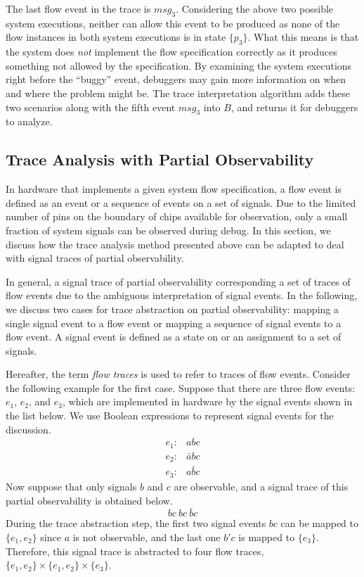 \documentclass[conference]{IEEEtran}
\begin{document}
The last flow event in the trace is $\mathit{msg}_3$.  Considering the above two possible system executions, neither can allow this event to be produced as none of the flow instances in both system executions is in state $\{p_3\}$.  What this means is that the system does {\em not} implement the flow specification correctly as it produces something not allowed by the specification.  By examining the system executions right before the ``buggy'' event, debuggers may gain more information on when and where the problem might be.  The trace interpretation algorithm adds these two scenarios along with the fifth event $\mathit{msg_3}$ into $B$, and returns it for debuggers to analyze.



\subsection{Trace Analysis with Partial Observability}

In hardware that implements a given system flow specification, a flow event is defined as an event or a sequence of events on a set of signals.  Due to the limited number of pins on the boundary of chips available for observation, only a small fraction of system signals can be observed during debug.  In this section, we discuss how the trace analysis method presented above can be adapted to deal with signal traces of partial observability.

In general, a signal trace of partial observability corresponding a set of traces of flow events due to the ambiguous interpretation of signal events.  In the following, we discuss two cases for trace abstraction on partial observability: mapping a single signal event to a flow event or mapping a sequence of signal events to a flow event.  A signal event is defined as a state on or an assignment to a set of signals.  

Hereafter, the term {\em flow traces} is used to refer to traces of flow events. 
Consider the following example for the first case.  Suppose that there are three flow events: $e_1$, $e_2$, and $e_3$, which are implemented in hardware by the signal events shown in the list below.  We use Boolean expressions to represent signal events for the discussion.
\[
\begin{array}{cl}
e_1: & abc\\
e_2: & \bar{a}bc\\
e_3: & a\bar{b}c
\end{array}
\] 
Now suppose that only signals $b$ and $c$ are observable, and a signal trace of this partial observability is obtained below.
\[
bc\ bc \ \bar{b}c
\]
During the trace abstraction step, the first two signal events $bc$ can be mapped to $\{e_1, e_2\}$ since $a$ is not observable, and the last one $b'c$ is mapped to $\{e_3\}$.  Therefore, this signal trace is abstracted to four flow traces, $\{e_1, e_2\} \times \{e_1, e_2\} \times \{e_3\}$.
\end{document}
